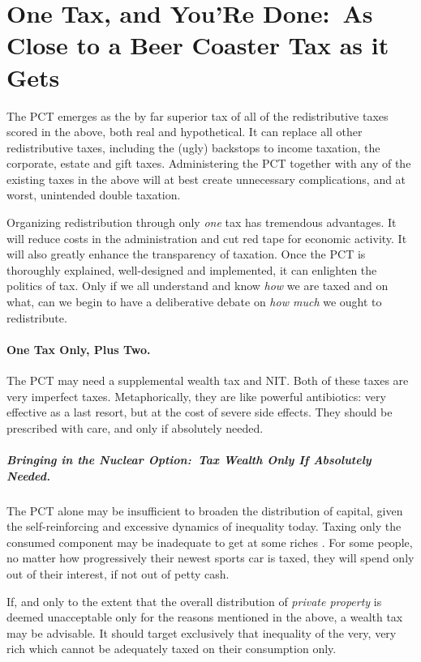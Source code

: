 

\section[One Tax Only]{One Tax, and You'Re Done:\ As Close to a Beer Coaster Tax as it Gets}
	\label{sec:OneTax}
The PCT emerges as the by far superior tax of all of the redistributive taxes scored in the above, both real and hypothetical.
It can replace all other redistributive taxes, including the (ugly) backstops to income taxation, the corporate, estate and gift taxes.
Administering the PCT together with any of the existing taxes in the above will at best create unnecessary complications, and at worst, unintended double taxation.

Organizing redistribution through only \emph{one} tax has tremendous advantages.
It will reduce costs in the administration and cut red tape for economic activity.
It will also greatly enhance the transparency of taxation.
Once the PCT is thoroughly explained, well-designed and implemented, it can enlighten the politics of tax.
Only if we all understand and know \emph{how} we are taxed and on what, can we begin to have a deliberative debate on \emph{how much} we ought to redistribute.

\paragraph{One Tax Only, Plus Two.}
The PCT may need a supplemental wealth tax and NIT.
Both of these taxes are very imperfect taxes.
Metaphorically, they are like powerful antibiotics:
very effective as a last resort, but at the cost of severe side effects.
They should be prescribed with care, and only if absolutely needed.

\subparagraph{Bringing in the Nuclear Option:~Tax Wealth Only If Absolutely Needed.}
The PCT alone may be insufficient to broaden the distribution of capital, given the self-reinforcing and excessive dynamics of inequality today.
Taxing only the consumed component may be inadequate to get at some riches \citep[106]{Shaviro2004}.
For some people, no matter how progressively their newest sports car is taxed, they will spend only out of their interest, if not out of petty cash.

If, and only to the extent that the overall distribution of \emph{private property} is deemed unacceptable only for the reasons mentioned in the above, a wealth tax may be advisable.
It should target exclusively that inequality of the very, very rich which cannot be adequately taxed on their consumption only.

